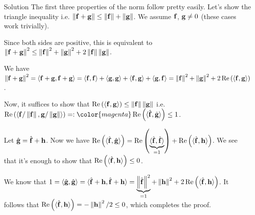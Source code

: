 \begin{frame}{Solution}
The first three properties of the norm follow pretty easily. Let's show the triangle inequality i.e.  $ \left\lVert\mathbf{f} + \mathbf{g}\right\rVert \leq \left\lVert\mathbf{f}\right\rVert + \left\lVert\mathbf{g}\right\rVert $. We assume $ \mathbf{f} $, $ \mathbf{g} \neq 0$ (these cases work trivially).

Since both sides are positive, this is equivalent to {\color{purple} $ \left\lVert\mathbf{f} + \mathbf{g}\right\rVert^2 \leq \left\lVert\mathbf{f}\right\rVert^2 + \left\lVert\mathbf{g}\right\rVert^2 + 2 \left\lVert\mathbf{f}\right\rVert \left\lVert\mathbf{g}\right\rVert$}.

We have $ \left\lVert\mathbf{f} + \mathbf{g}\right\rVert^2 = \langle \mathbf{f}+\mathbf{g},\mathbf{f}+\mathbf{g} \rangle = \langle \mathbf{f},\mathbf{f} \rangle  + \langle \mathbf{g},\mathbf{g} \rangle + \langle \mathbf{f},\mathbf{g} \rangle + \langle \mathbf{g},\mathbf{f} \rangle  =  \left\lVert\mathbf{f}\right\rVert^2 + \left\lVert\mathbf{g}\right\rVert^2 + 2 \operatorname{Re} \left( \langle \mathbf{f},\mathbf{g} \rangle \right)$.

Now, it suffices to show that $ \operatorname{Re} \left( \langle \mathbf{f},\mathbf{g} \rangle \right) \leq \left\lVert\mathbf{f}\right\rVert \left\lVert\mathbf{g}\right\rVert $ i.e. $ \Re \left( \iprod{\fone/\norm{\fone}}{\ftwo/\norm{\ftwo}} \right) 
=: {\color{magenta} \Re \left( \iprod{\hat{\fone}}{\hat{\ftwo}} \right)
\leq 1 }$.

Let $ \hat{\mathbf{g}} = \hat{\mathbf{f}} + \mathbf{h} $. 
Now we have $ \operatorname{Re} \left( \langle \hat{\mathbf{f}},\hat{\mathbf{g}} \rangle \right) = \operatorname{Re} \left( \underbrace{\langle \hat{\mathbf{f}},\hat{\mathbf{f}} \rangle}_{=1} \right) + \operatorname{Re} \left( \langle \hat{\mathbf{f}},\mathbf{h} \rangle \right)$. We see that it's enough to show that {\color{magenta}$ \operatorname{Re} \left( \langle \hat{\mathbf{f}},\mathbf{h} \rangle \right) \leq 0 $}.

We know that $ 1 = \langle \hat{\mathbf{g}},\hat{\mathbf{g}} \rangle = \langle \hat{\mathbf{f}} + \mathbf{h},\hat{\mathbf{f}} + \mathbf{h} \rangle = \underbrace{\left\lVert\hat{\mathbf{f}}\right\rVert^2}_{=1} + \left\lVert\mathbf{h}\right\rVert^2 + 2\operatorname{Re} \left( \langle \hat{\mathbf{f}},\mathbf{h} \rangle \right)$. It follows that $ \operatorname{Re} \left( \langle \hat{\mathbf{f}},\mathbf{h} \rangle \right) = - \left\lVert\mathbf{h}\right\rVert^2/2 \leq 0 $, which completes the proof.

\end{frame}


